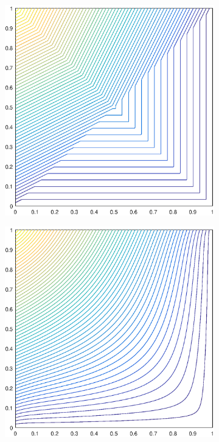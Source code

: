 \documentclass[11pt]{article}
\begin{document}
\begin{figure}
\begin{subfigure}[b]{0.225\textwidth}
		\includegraphics[width=\textwidth]{figures/square_PWLD1_contour_b4.eps}
		\caption{}
	\end{subfigure}
	\vfill
	\begin{subfigure}[b]{0.225\textwidth}
		\centering
		\includegraphics[width=\textwidth]{figures/square_MV1_contour_b4.eps}

\end{subfigure}
\end{figure}
\end{document}
